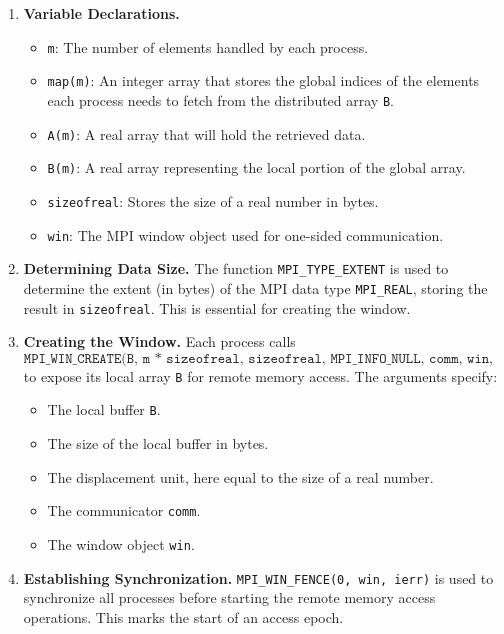 \documentclass[12pt]{book}
\begin{document}
\begin{enumerate}
    \item \textbf{Variable Declarations.}
    \begin{itemize}
        \item \texttt{m}: The number of elements handled by each process.
        \item \texttt{map(m)}: An integer array that stores the global indices of the elements each process needs to fetch from the distributed array \texttt{B}.
        \item \texttt{A(m)}: A real array that will hold the retrieved data.
        \item \texttt{B(m)}: A real array representing the local portion of the global array.
        \item \texttt{sizeofreal}: Stores the size of a real number in bytes.
        \item \texttt{win}: The MPI window object used for one-sided communication.
    \end{itemize}

    \item \textbf{Determining Data Size.}
    The function \texttt{MPI\_TYPE\_EXTENT} is used to determine the extent (in bytes) of the MPI data type \texttt{MPI\_REAL}, storing the result in \texttt{sizeofreal}. This is essential for creating the window.

    \item \textbf{Creating the Window.}
    Each process calls
    \[
    \texttt{MPI\_WIN\_CREATE(B, m * sizeofreal, sizeofreal, MPI\_INFO\_NULL, comm, win, ierr)}
    \]
    to expose its local array \texttt{B} for remote memory access. The arguments specify:
    \begin{itemize}
        \item The local buffer \texttt{B}.
        \item The size of the local buffer in bytes.
        \item The displacement unit, here equal to the size of a real number.
        \item The communicator \texttt{comm}.
        \item The window object \texttt{win}.
    \end{itemize}

    \item \textbf{Establishing Synchronization.}
    \texttt{MPI\_WIN\_FENCE(0, win, ierr)} is used to synchronize all processes before starting the remote memory access operations. This marks the start of an access epoch.


\end{enumerate}
\end{document}
